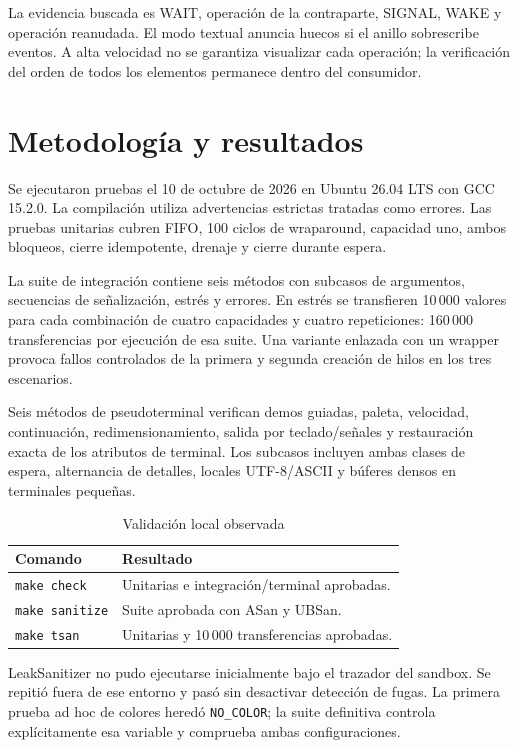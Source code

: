 \documentclass[conference]{IEEEtran}
\begin{document}
La evidencia buscada es WAIT, operación de la contraparte, SIGNAL, WAKE y operación
reanudada. El modo textual anuncia huecos si el anillo sobrescribe eventos. A alta
velocidad no se garantiza visualizar cada operación; la verificación del orden de
todos los elementos permanece dentro del consumidor.

\section{Metodología y resultados}
Se ejecutaron pruebas el 10 de octubre de 2026 en Ubuntu 26.04 LTS con GCC 15.2.0.
La compilación utiliza advertencias estrictas tratadas como errores. Las pruebas
unitarias cubren FIFO, 100 ciclos de wraparound, capacidad uno, ambos bloqueos,
cierre idempotente, drenaje y cierre durante espera.

La suite de integración contiene seis métodos con subcasos de argumentos,
secuencias de señalización, estrés y errores. En estrés se transfieren 10\,000
valores para cada combinación de cuatro capacidades y cuatro repeticiones:
160\,000 transferencias por ejecución de esa suite. Una variante enlazada con un
wrapper provoca fallos controlados de la primera y segunda creación de hilos en
los tres escenarios.

Seis métodos de pseudoterminal verifican demos guiadas, paleta, velocidad,
continuación, redimensionamiento, salida por teclado/señales y restauración exacta
de los atributos de terminal. Los subcasos incluyen ambas clases de espera, alternancia de detalles,
locales UTF-8/ASCII y búferes densos en terminales pequeñas.

\begin{table}[ht]
\caption{Validación local observada}
\centering
\begin{tabular}{lp{4.0cm}}
\hline
Comando & Resultado\\\hline
\texttt{make check} & Unitarias e integración/terminal aprobadas.\\
\texttt{make sanitize} & Suite aprobada con ASan y UBSan.\\
\texttt{make tsan} & Unitarias y 10\,000 transferencias aprobadas.\\\hline
\end{tabular}
\end{table}

LeakSanitizer no pudo ejecutarse inicialmente bajo el trazador del sandbox. Se
repitió fuera de ese entorno y pasó sin desactivar detección de fugas. La primera
prueba ad hoc de colores heredó \texttt{NO\_COLOR}; la suite definitiva controla
explícitamente esa variable y comprueba ambas configuraciones.
\end{document}
